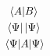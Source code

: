 

\begin{gather*}
    \braket{A|B} \\
    \bra{\Psi}\ket{\Psi}\\
    \expval{A}{\Psi}
\end{gather*}
